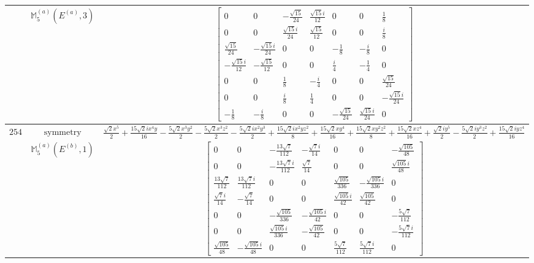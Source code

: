 \documentclass[fleqn,8pt,landscape]{jsarticle}
\begin{document}
\begin{longtable}{ccc}
$  $ & $ \mathbb{M}_{5}^{(a)}(E^{(a)},3) $ & $ \begin{bmatrix} 0 & 0 & - \frac{\sqrt{15}}{24} & \frac{\sqrt{15} i}{12} & 0 & 0 & \frac{1}{8} \\ 0 & 0 & \frac{\sqrt{15} i}{24} & \frac{\sqrt{15}}{12} & 0 & 0 & \frac{i}{8} \\ \frac{\sqrt{15}}{24} & - \frac{\sqrt{15} i}{24} & 0 & 0 & - \frac{1}{8} & - \frac{i}{8} & 0 \\ - \frac{\sqrt{15} i}{12} & - \frac{\sqrt{15}}{12} & 0 & 0 & \frac{i}{4} & - \frac{1}{4} & 0 \\ 0 & 0 & \frac{1}{8} & - \frac{i}{4} & 0 & 0 & \frac{\sqrt{15}}{24} \\ 0 & 0 & \frac{i}{8} & \frac{1}{4} & 0 & 0 & - \frac{\sqrt{15} i}{24} \\ - \frac{1}{8} & - \frac{i}{8} & 0 & 0 & - \frac{\sqrt{15}}{24} & \frac{\sqrt{15} i}{24} & 0 \end{bmatrix} $ \\ \hline
$ 254 $ & $ \text{symmetry} $ & $ \frac{\sqrt{2} x^{5}}{2} + \frac{15 \sqrt{2} i x^{4} y}{16} - \frac{5 \sqrt{2} x^{3} y^{2}}{2} - \frac{5 \sqrt{2} x^{3} z^{2}}{2} - \frac{5 \sqrt{2} i x^{2} y^{3}}{2} + \frac{15 \sqrt{2} i x^{2} y z^{2}}{8} + \frac{15 \sqrt{2} x y^{4}}{16} + \frac{15 \sqrt{2} x y^{2} z^{2}}{8} + \frac{15 \sqrt{2} x z^{4}}{16} + \frac{\sqrt{2} i y^{5}}{2} - \frac{5 \sqrt{2} i y^{3} z^{2}}{2} + \frac{15 \sqrt{2} i y z^{4}}{16} $ \\
$  $ & $ \mathbb{M}_{5}^{(a)}(E^{(b)},1) $ & $ \begin{bmatrix} 0 & 0 & - \frac{13 \sqrt{7}}{112} & - \frac{\sqrt{7} i}{14} & 0 & 0 & - \frac{\sqrt{105}}{48} \\ 0 & 0 & - \frac{13 \sqrt{7} i}{112} & \frac{\sqrt{7}}{14} & 0 & 0 & \frac{\sqrt{105} i}{48} \\ \frac{13 \sqrt{7}}{112} & \frac{13 \sqrt{7} i}{112} & 0 & 0 & \frac{\sqrt{105}}{336} & - \frac{\sqrt{105} i}{336} & 0 \\ \frac{\sqrt{7} i}{14} & - \frac{\sqrt{7}}{14} & 0 & 0 & \frac{\sqrt{105} i}{42} & \frac{\sqrt{105}}{42} & 0 \\ 0 & 0 & - \frac{\sqrt{105}}{336} & - \frac{\sqrt{105} i}{42} & 0 & 0 & - \frac{5 \sqrt{7}}{112} \\ 0 & 0 & \frac{\sqrt{105} i}{336} & - \frac{\sqrt{105}}{42} & 0 & 0 & - \frac{5 \sqrt{7} i}{112} \\ \frac{\sqrt{105}}{48} & - \frac{\sqrt{105} i}{48} & 0 & 0 & \frac{5 \sqrt{7}}{112} & \frac{5 \sqrt{7} i}{112} & 0 \end{bmatrix} $ \\ \hline

\end{longtable}
\end{document}

